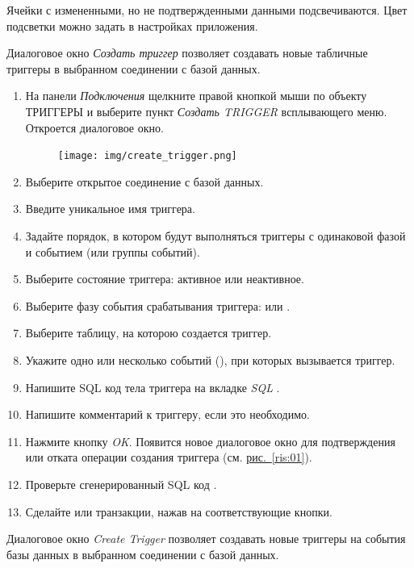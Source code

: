 Ячейки с измененными, но не подтвержденными данными подсвечиваются. Цвет подсветки можно задать в настройках приложения.



\label{sec:crtrig}
Диалоговое окно \textit{Создать триггер} позволяет создавать новые табличные триггеры в выбранном соединении с базой данных.

\begin{enumerate}[leftmargin=26pt]
	\item  На панели \textit{Подключения} щелкните правой кнопкой мыши по объекту ТРИГГЕРЫ и выберите пункт \textit{Создать TRIGGER} всплывающего меню. Откроется диалоговое окно.
	\begin{figure}[H]
		\centering
		\texttt{[image: img/create\_trigger.png]}
	\end{figure}
	\item Выберите открытое соединение с базой данных.
	\item Введите уникальное имя триггера.
	\item Задайте порядок, в котором будут выполняться триггеры с одинаковой фазой и событием (или группы событий).
	\item Выберите состояние триггера: активное или неактивное. 
	\item Выберите фазу события срабатывания триггера:  или .
	\item Выберите таблицу, на которою создается триггер.
	\item Укажите одно или несколько событий (), при которых вызывается триггер.  
	\item Напишите SQL код тела триггера на вкладке \textit{SQL} .
	\item Напишите комментарий к триггеру, если это необходимо.
	\item Нажмите кнопку \textit{OK}. Появится новое диалоговое окно для подтверждения или отката операции создания триггера (см. \hyperref[ris:01]{рис.~\ref{ris:01}}).
	\item Проверьте сгенерированный SQL код .
	\item Сделайте  или  транзакции, нажав на соответствующие кнопки.
\end{enumerate}	

Диалоговое окно \textit{Create Trigger} позволяет создавать новые триггеры на события базы данных в выбранном соединении с базой данных.

